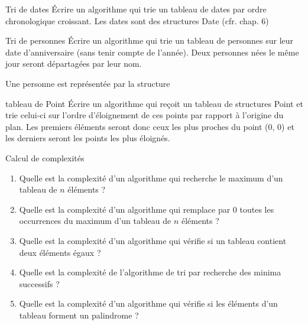 	\begin{Exercice}{Tri de dates}
			Écrire un algorithme qui trie un tableau de 
			dates par ordre chronologique croissant.
			Les dates sont des structures Date (cfr. chap. 6)
	\end{Exercice}
	
	\begin{Exercice}{Tri de personnes}
			Écrire un algorithme qui trie un tableau de personnes sur leur date
			d'anniversaire (sans tenir compte de
			l'année). Deux personnes nées le même jour seront
			départagées par leur nom.

			Une personne est représentée par la structure 
			
			
			
	\end{Exercice}
	
	\begin{Exercice}{tableau de Point}
		Écrire un algorithme qui reçoit un tableau de structures Point 
		et trie celui-ci sur l'ordre d'éloignement de ces points par 
		rapport à l'origine du plan. Les premiers éléments seront donc
		ceux les plus proches du point (0, 0) et les derniers seront 
		les points les plus éloignés.
	\end{Exercice}

	\begin{Exercice}{Calcul de complexités}
			
			\begin{enumerate}[label=\alph*)]
				\item 
					Quelle est la complexité d'un algorithme qui recherche
					le maximum d'un tableau de $n$ éléments ?
				\item 
					Quelle est la complexité d'un algorithme qui remplace
					par 0 toutes les occurrences du maximum d'un tableau
					de $n$ éléments ?
				\item 
					Quelle est la complexité d'un algorithme qui vérifie si
					un tableau contient deux éléments égaux ?
				\item 
					Quelle est la complexité de l'algorithme de tri par
					recherche des minima successifs ?
				\item 
					Quelle est la complexité d'un algorithme qui vérifie si
					les éléments d'un tableau forment un palindrome ?
			\end{enumerate}
		\end{Exercice}
		
